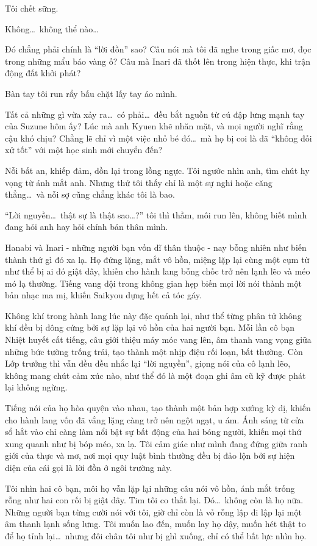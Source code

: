 \documentclass[../main.tex]{subfiles}
\begin{document}
Tôi chết sững.

Không\dots\ không thể nào\dots

Đó chẳng phải chính là ``lời đồn'' sao? Câu nói mà tôi đã nghe trong giấc mơ, đọc trong những mẩu báo vàng ố? Câu mà Inari đã thốt lên trong hiện thực, khi trận động đất khởi phát?

Bàn tay tôi run rẩy bấu chặt lấy tay áo mình.

Tất cả những gì vừa xảy ra\dots\ có phải\dots\ đều bắt nguồn từ cú đập lưng mạnh tay của Suzune hôm ấy? Lúc mà anh Kyuen khẽ nhăn mặt, và mọi người nghĩ rằng cậu khó chịu? Chẳng lẽ chỉ vì một việc nhỏ bé đó\dots\ mà họ bị coi là đã ``không đối xử tốt'' với một học sinh mới chuyển đến?

Nỗi bất an, khiếp đảm, dồn lại trong lồng ngực. Tôi ngước nhìn anh, tìm chút hy vọng từ ánh mắt anh. Nhưng thứ tôi thấy chỉ là một sự nghi hoặc căng thẳng\dots\ và nỗi sợ cũng chẳng khác tôi là bao.

``Lời nguyền\dots\ thật sự là thật sao\dots?'' tôi thì thầm, môi run lên, không biết mình đang hỏi anh hay hỏi chính bản thân mình.

Hanabi và Inari - những người bạn vốn dĩ thân thuộc - nay bỗng nhiên như biến thành thứ gì đó xa lạ. Họ đứng lặng, mắt vô hồn, miệng lặp lại cùng một cụm từ như thể bị ai đó giật dây, khiến cho hành lang bỗng chốc trở nên lạnh lẽo và méo mó lạ thường. Tiếng vang dội trong không gian hẹp biến mọi lời nói thành một bản nhạc ma mị, khiến Saikyou dựng hết cả tóc gáy.

Không khí trong hành lang lúc này đặc quánh lại, như thể từng phân tử không khí đều bị đông cứng bởi sự lặp lại vô hồn của hai người bạn. Mỗi lần cô bạn Nhiệt huyết cất tiếng, câu giới thiệu máy móc vang lên, âm thanh vang vọng giữa những bức tường trống trải, tạo thành một nhịp điệu rối loạn, bất thường. Còn Lớp trưởng thì vẫn đều đều nhắc lại ``lời nguyền'', giọng nói của cô lạnh lẽo, không mang chút cảm xúc nào, như thể đó là một đoạn ghi âm cũ kỹ được phát lại không ngừng.

Tiếng nói của họ hòa quyện vào nhau, tạo thành một bản hợp xướng kỳ dị, khiến cho hành lang vốn đã vắng lặng càng trở nên ngột ngạt, u ám. Ánh sáng từ cửa sổ hắt vào chỉ càng làm nổi bật sự bất động của hai bóng người, khiến mọi thứ xung quanh như bị bóp méo, xa lạ. Tôi cảm giác như mình đang đứng giữa ranh giới của thực và mơ, nơi mọi quy luật bình thường đều bị đảo lộn bởi sự hiện diện của cái gọi là lời đồn ở ngôi trường này.

Tôi nhìn hai cô bạn, môi họ vẫn lặp lại những câu nói vô hồn, ánh mắt trống rỗng như hai con rối bị giật dây. Tim tôi co thắt lại. Đó\dots\ không còn là họ nữa. Những người bạn từng cười nói với tôi, giờ chỉ còn là vỏ rỗng lập đi lập lại một âm thanh lạnh sống lưng. Tôi muốn lao đến, muốn lay họ dậy, muốn hét thật to để họ tỉnh lại\dots\ nhưng đôi chân tôi như bị ghì xuống, chỉ có thể bất lực nhìn họ.
\end{document}
